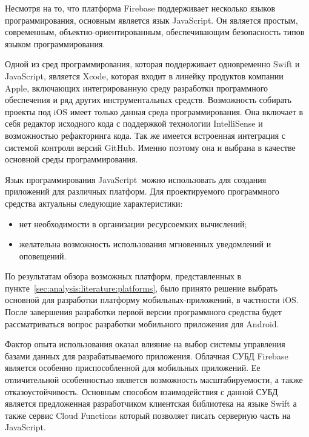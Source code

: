Несмотря на то, что платформа Firebase поддерживает несколько языков программирования, основным является язык JavaScript. Он является простым, современным, объектно-ориентированным, обеспечивающим безопасность типов языком программирования.

Одной из сред программирования, которая поддерживает одновременно Swift и JavaScript, является Xcode, которая входит в линейку продуктов компании Apple, включающих интегрированную среду разработки программного обеспечения и ряд других инструментальных средств. Возможность собирать проекты под iOS имеет только данная среда программирования. Она включает в себя редактор исходного кода с поддержкой технологии In\-tel\-li\-Sen\-se и возможностью рефакторинга кода. Так же имеется встроенная интеграция с системой контроля версий GitHub. Именно поэтому она и выбрана в качестве основной среды программирования.

Язык программирования JavaScript~можно использовать для создания приложений для различных платформ. Для проектируемого программного сре\-д\-с\-т\-ва актуальны следующие характеристики:
\begin{itemize}
  \item нет необходимости в организации ресурсоемких вычислений;
  \item желательна возможность использования мгновенных уведомлений и оповещений.
\end{itemize}

По результатам обзора возможных платформ, представленных в пункте~\ref{sec:analysis:literature:platforms}, было принято решение выбрать основной для разработки платформу мобильных-приложений, в частности iOS. После завершения разработки первой версии программного средства будет рассматриваться вопрос разработки мобильного приложения для Android.

Фактор опыта использования оказал влияние на выбор  системы управления базами данных для разрабатываемого приложения. Облачная СУБД Firebase является особенно приспособленной для мобильных приложений. Ее отличительной особенностью является возможность масштабируемости, а также отказоустойчивость. Основным способом взаимодействия с данной СУБД является предложенная разработчиком клиентская библиотека на языке Swift а также сервис Cloud Functions который позволяет писать серверную часть на JavaScript.